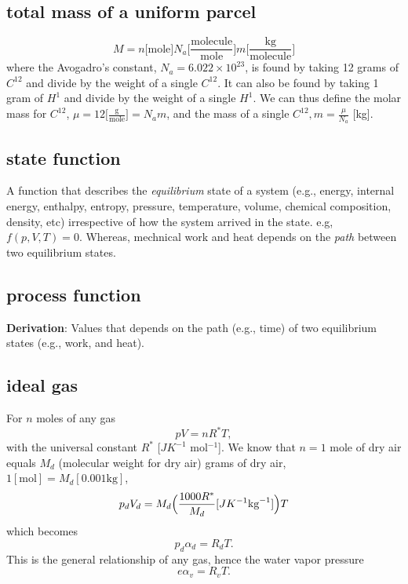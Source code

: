 \setlength\parindent{0pt} %
\subsection{total mass of a uniform parcel}
\begin{equation}
   M = n \big[\text{mole}\big] N_a \big[\frac{\text{molecule}}{\text{mole}}\big] m \big[\frac{\text{kg}}{\text{molecule}}\big]
\end{equation}
where the Avogadro's constant, $N_a = 6.022\times10^{23}$, is found by taking 12 grams of
$C^{12}$ and divide by the weight of a single $C^{12}$. It can also be found by taking 1 gram of 
$H^{1}$ and divide by the weight of a single $H^{1}$. We can thus define the molar mass for
$C^{12}$, $\mu = 12 \big[\frac{\text{g}}{\text{mole}}\big] = N_a m$, and the mass of a single
$C^{12}, m = \frac{\mu}{N_a}$ [kg]. 


\subsection{state function}
A function that describes the \emph{equilibrium} state of a system (e.g., energy, internal energy,
enthalpy, entropy, pressure, temperature, volume, chemical composition, density, etc) irrespective
of how the system arrived in the state. e.g, $f(p,V,T)=0$. Whereas, mechnical work and heat depends
on the \emph{path} between two equilibrium states. \\

\subsection{process function}
{\bf{Derivation}}: Values that depends on the path (e.g., time) of two equilibrium states (e.g.,
work, and heat).

\subsection{ideal gas}
For $n$ moles of any gas
\begin{equation}
    pV = nR^*T,
\end{equation}
with the universal constant $R^*$ [$J K^{-1}$ mol$^{-1}$]. We know that $n=1$ mole of dry air equals
$M_d$ (molecular weight for dry air) grams of dry air, $1[\text{mol}] = M_d [0.001\text{kg}]$,
\begin{equation}
        p_d V_d  = M_d \Big(\frac{1000 R^*}{M_d} [ J K^{-1} \text{kg}^{-1}]\Big) T \\
\end{equation}
which becomes
\begin{equation} \label{eq:idealgas2}
    p_d \alpha_d = R_d T.
\end{equation}
This is the general relationship of any gas, hence the water vapor pressure 
\begin{equation} \label{eq:idealgas3}
   e \alpha_v = R_v T.
\end{equation}



